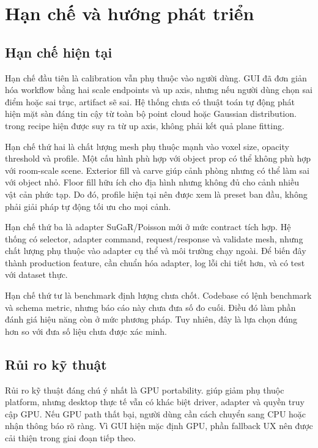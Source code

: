 \section{Hạn chế và hướng phát triển}

\subsection{Hạn chế hiện tại}

Hạn chế đầu tiên là calibration vẫn phụ thuộc vào người dùng. GUI đã đơn giản hóa workflow bằng hai scale endpoints và up axis, nhưng nếu người dùng chọn sai điểm hoặc sai trục, artifact sẽ sai. Hệ thống chưa có thuật toán tự động phát hiện mặt sàn đáng tin cậy từ toàn bộ point cloud hoặc Gaussian distribution.  trong recipe hiện được suy ra từ up axis, không phải kết quả plane fitting.

Hạn chế thứ hai là chất lượng mesh phụ thuộc mạnh vào voxel size, opacity threshold và profile. Một cấu hình phù hợp với object prop có thể không phù hợp với room-scale scene. Exterior fill và carve giúp cảnh phòng nhưng có thể làm sai với object nhỏ. Floor fill hữu ích cho địa hình nhưng không đủ cho cảnh nhiều vật cản phức tạp. Do đó, profile hiện tại nên được xem là preset ban đầu, không phải giải pháp tự động tối ưu cho mọi cảnh.

Hạn chế thứ ba là adapter SuGaR/Poisson mới ở mức contract tích hợp. Hệ thống có selector, adapter command, request/response và validate mesh, nhưng chất lượng phụ thuộc vào adapter cụ thể và môi trường chạy ngoài. Để biến đây thành production feature, cần chuẩn hóa adapter, log lỗi chi tiết hơn, và có test với dataset thực.

Hạn chế thứ tư là benchmark định lượng chưa chốt. Codebase có lệnh benchmark và schema metric, nhưng báo cáo này chưa đưa số đo cuối. Điều đó làm phần đánh giá hiệu năng còn ở mức phương pháp. Tuy nhiên, đây là lựa chọn đúng hơn so với đưa số liệu chưa được xác minh.

\subsection{Rủi ro kỹ thuật}

Rủi ro kỹ thuật đáng chú ý nhất là GPU portability.  giúp giảm phụ thuộc platform, nhưng desktop thực tế vẫn có khác biệt driver, adapter và quyền truy cập GPU. Nếu GPU path thất bại, người dùng cần cách chuyển sang CPU hoặc nhận thông báo rõ ràng. Vì GUI hiện mặc định GPU, phần fallback UX nên được cải thiện trong giai đoạn tiếp theo.

